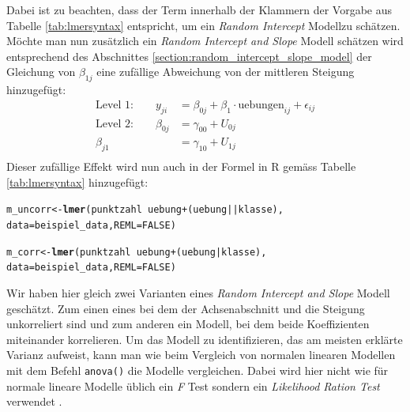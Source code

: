 \documentclass[12pt]{article}\usepackage[]{graphicx}\usepackage[]{color}
\makeatletter
\newcommand{\hlnum}[1]{\textcolor[rgb]{0.686,0.059,0.569}{#1}}%
\newcommand{\hlopt}[1]{\textcolor[rgb]{0,0,0}{#1}}%
\newcommand{\hlstd}[1]{\textcolor[rgb]{0.345,0.345,0.345}{#1}}%
\newcommand{\hlkwb}[1]{\textcolor[rgb]{0.69,0.353,0.396}{#1}}%
\newcommand{\hlkwc}[1]{\textcolor[rgb]{0.333,0.667,0.333}{#1}}%
\newcommand{\hlkwd}[1]{\textcolor[rgb]{0.737,0.353,0.396}{\textbf{#1}}}%
\newenvironment{kframe}{%
 \def\at@end@of@kframe{}%
 \ifinner\ifhmode%
  \def\at@end@of@kframe{\end{minipage}}%
  \begin{minipage}{\columnwidth}%
 \fi\fi%
 \def\FrameCommand##1{\hskip\@totalleftmargin \hskip-\fboxsep
 \colorbox{shadecolor}{##1}\hskip-\fboxsep
     \hskip-\linewidth \hskip-\@totalleftmargin \hskip\columnwidth}%
 \MakeFramed {\advance\hsize-\width
   \@totalleftmargin\z@ \linewidth\hsize
   \@setminipage}}%
 {\par\unskip\endMakeFramed%
 \at@end@of@kframe}
\newenvironment{knitrout}{}{} %
\makeatother
\begin{document}
Dabei ist zu beachten, dass der Term innerhalb der Klammern der Vorgabe aus Tabelle \ref{tab:lmersyntax} entspricht, um ein \textit{Random Intercept} Modellzu schätzen. Möchte man nun zusätzlich ein \textit{Random Intercept and Slope} Modell schätzen wird entsprechend des Abschnittes \ref{section:random_intercept_slope_model} der Gleichung von $\beta_{1j}$ eine zufällige Abweichung von der mittleren Steigung hinzugefügt: 
\begin{equation} 
\begin{split}	
 \text{Level 1:}  \qquad y_{ji} & = \beta_{0j} + \beta_{1} \cdot \text{uebungen}_{ij} + \epsilon_{ij}\\
 \text{Level 2:} \qquad \beta_{0j} & = \gamma_{00} + U_{0j}\\
 \beta_{j1} & = \gamma_{10 }+ U_{1j}\\
\end{split}	
\end{equation} 
Dieser zufällige Effekt wird nun auch in der Formel in R gemäss Tabelle \ref{tab:lmersyntax} hinzugefügt:

\singlespacing
\begin{knitrout}
\color{fgcolor}\begin{kframe}
\begin{alltt}
\hlstd{m_uncorr} \hlkwb{<-} \hlkwd{lmer}\hlstd{(punktzahl} \hlopt{~} \hlstd{uebung} \hlopt{+} \hlstd{(uebung} \hlopt{||} \hlstd{klasse),}
        \hlkwc{data} \hlstd{= beispiel_data,} \hlkwc{REML} \hlstd{=} \hlnum{FALSE}\hlstd{)}

\hlstd{m_corr} \hlkwb{<-} \hlkwd{lmer}\hlstd{(punktzahl} \hlopt{~} \hlstd{uebung} \hlopt{+} \hlstd{(uebung} \hlopt{|} \hlstd{klasse),}
        \hlkwc{data} \hlstd{= beispiel_data,} \hlkwc{REML} \hlstd{=} \hlnum{FALSE}\hlstd{)}
\end{alltt}
\end{kframe}
\end{knitrout}

Wir haben hier gleich zwei Varianten eines \textit{Random Intercept and Slope} Modell geschätzt. Zum einen eines bei dem der Achsenabschnitt und die Steigung unkorreliert sind und zum anderen ein Modell, bei dem beide Koeffizienten miteinander korrelieren. Um das Modell zu identifizieren, das am meisten erklärte Varianz aufweist, kann man wie beim Vergleich von normalen linearen Modellen mit dem Befehl \texttt{anova()} die Modelle vergleichen. Dabei wird hier nicht wie für normale lineare Modelle üblich ein \textit{F} Test sondern ein \textit{Likelihood Ration Test} verwendet \citep{PEUGH201085,SnijdersTomA.B2012Ma:a}. 
\end{document}
